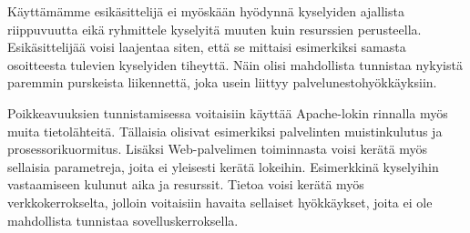 Käyttämämme esikäsittelijä ei myöskään hyödynnä kyselyiden ajallista
riippuvuutta eikä ryhmittele kyselyitä muuten kuin resurssien
perusteella. Esikäsittelijää voisi laajentaa siten, että se mittaisi
esimerkiksi samasta osoitteesta tulevien kyselyiden tiheyttä. Näin
olisi mahdollista tunnistaa nykyistä paremmin purskeista liikennettä,
joka usein liittyy palvelunestohyökkäyksiin.

Poikkeavuuksien tunnistamisessa voitaisiin käyttää Apache-lokin
rinnalla myös muita tietolähteitä. Tällaisia olisivat esimerkiksi
palvelinten muistinkulutus ja prosessorikuormitus. Lisäksi
Web-palvelimen toiminnasta voisi kerätä myös sellaisia parametreja,
joita ei yleisesti kerätä lokeihin. Esimerkkinä kyselyihin vastaamiseen kulunut
aika ja resurssit. Tietoa voisi kerätä myös verkkokerrokselta,
jolloin voitaisiin havaita sellaiset hyökkäykset, joita ei ole
mahdollista tunnistaa sovelluskerroksella.

